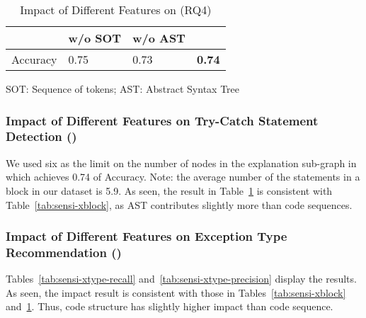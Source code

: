 \begin{table}[t]
  \caption{Impact of Different Features on {\xstate} (RQ4)}
  \vspace{-12pt}
  \small
	\begin{center}
		\renewcommand{\arraystretch}{1}
		\begin{tabular}{p{1.75cm}<{\centering}|p{1.75cm}<{\centering}|p{1.75cm}<{\centering}|p{1.75cm}<{\centering}}
			\hline
			  & \tool w/o SOT & \tool w/o AST & \tool \\
			\hline
			Accuracy    & 0.75 & 0.73 & \textbf{0.74} \\
			\hline
		\end{tabular}
		SOT: Sequence of tokens; AST: Abstract Syntax Tree
		\label{tab:sensi-xstate}
	\end{center}
\end{table}

\subsubsection{Impact of Different Features on Try-Catch Statement Detection ({\xstate})}

We used six as the limit on the number of nodes in the explanation
sub-graph in which {\tool} achieves 0.74 of Accuracy. Note: the
average number of the statements in a  block in our
dataset is 5.9. As seen, the result in Table~\ref{tab:sensi-xstate} is
consistent with Table~\ref{tab:sensi-xblock}, as AST contributes
slightly more than code sequences.


\subsubsection{Impact of Different Features on Exception Type Recommendation ({\xtype})}

Tables~\ref{tab:sensi-xtype-recall}
and~\ref{tab:sensi-xtype-precision} display the results. As seen, the
impact result is consistent with those in
Tables~\ref{tab:sensi-xblock} and~\ref{tab:sensi-xstate}.
Thus, code structure has slightly higher impact than code sequence.

